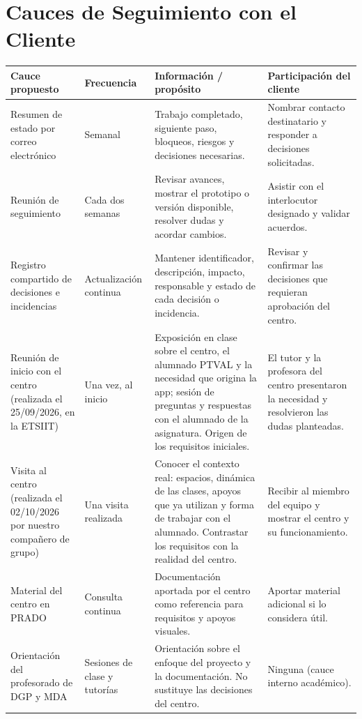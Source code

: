 \newpage
\section{Cauces de Seguimiento con el Cliente}


\begin{center}
\small
\begin{tabularx}{\textwidth}{|>{\raggedright\arraybackslash}p{3cm}|>{\raggedright\arraybackslash}p{2.6cm}|>{\raggedright\arraybackslash}X|>{\raggedright\arraybackslash}p{3cm}|}
\hline
\rowcolor{tableHeader}
Cauce propuesto & Frecuencia & Información / propósito & Participación del cliente \\
\hline
Resumen de estado por correo electrónico & Semanal & Trabajo completado, siguiente paso, bloqueos, riesgos y decisiones necesarias. & Nombrar contacto destinatario y responder a decisiones solicitadas. \\
\hline
Reunión de seguimiento & Cada dos semanas & Revisar avances, mostrar el prototipo o versión disponible, resolver dudas y acordar cambios. & Asistir con el interlocutor designado y validar acuerdos. \\
\hline
Registro compartido de decisiones e incidencias & Actualización continua & Mantener identificador, descripción, impacto, responsable y estado de cada decisión o incidencia. & Revisar y confirmar las decisiones que requieran aprobación del centro. \\
\hline
Reunión de inicio con el centro (realizada el 25/09/2026, en la ETSIIT) & Una vez, al inicio & Exposición en clase sobre el centro, el alumnado PTVAL y la necesidad que origina la app; sesión de preguntas y respuestas con el alumnado de la asignatura. Origen de los requisitos iniciales. & El tutor y la profesora del centro presentaron la necesidad y resolvieron las dudas planteadas. \\
\hline
Visita al centro (realizada el 02/10/2026 por nuestro compañero de grupo) & Una visita realizada & Conocer el contexto real: espacios, dinámica de las clases, apoyos que ya utilizan y forma de trabajar con el alumnado. Contrastar los requisitos con la realidad del centro. & Recibir al miembro del equipo y mostrar el centro y su funcionamiento. \\
\hline
Material del centro en PRADO & Consulta continua & Documentación aportada por el centro como referencia para requisitos y apoyos visuales. & Aportar material adicional si lo considera útil. \\
\hline
Orientación del profesorado de DGP y MDA & Sesiones de clase y tutorías & Orientación sobre el enfoque del proyecto y la documentación. No sustituye las decisiones del centro. & Ninguna (cauce interno académico). \\
\hline
\end{tabularx}
\end{center}

